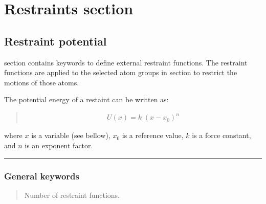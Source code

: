 \documentclass[a4paper,11pt,oneside,english]{sphinxmanual}
\begin{document}
\chapter{Restraints section}
\label{\detokenize{12_Restraints:restraints-section}}\label{\detokenize{12_Restraints:restraints}}\label{\detokenize{12_Restraints::doc}}

\section{Restraint potential}
\label{\detokenize{12_Restraints:restraint-potential}}
\sphinxstylestrong{{[}RESTRAINTS{]}} section contains keywords to define external
restraint functions. The restraint functions are applied to the
selected atom groups in \sphinxstylestrong{{[}SELECTION{]}} section to restrict the
motions of those atoms.

The potential energy of a restaint can be written as:
\begin{quote}

\vspace{-5mm}
\begin{equation*}
\begin{split}U(x) = k\;(x-x_{0})^{n}\end{split}
\end{equation*}
\vspace{-3mm}
\end{quote}

where \(x\) is a variable (see bellow), \(x_0\) is a reference value,
\(k\) is a force constant, and \(n\) is an exponent factor.


\bigskip\hrule\bigskip



\subsection{General keywords}
\label{\detokenize{12_Restraints:general-keywords}}
 
\begin{quote}


Number of restraint functions.
\end{quote}
\end{document}
